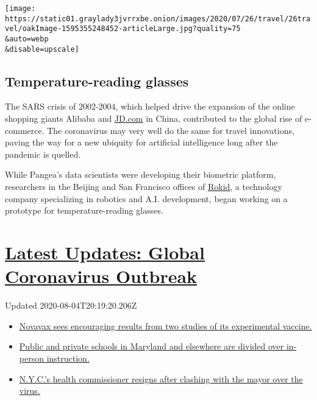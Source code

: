 \texttt{[image: https://static01.graylady3jvrrxbe.onion/images/2020/07/26/travel/26travel/oakImage-1595355248452-articleLarge.jpg?quality=75\\\&auto=webp\\\&disable=upscale]}

\hypertarget{temperature-reading-glasses}{%
\subsection{Temperature-reading
glasses}\label{temperature-reading-glasses}}

The SARS crisis of 2002-2004, which helped drive the expansion of the
online shopping giants Alibaba and \href{http://JD.com}{JD.com} in
China, contributed to the global rise of e-commerce. The coronavirus may
very well do the same for travel innovations, paving the way for a new
ubiquity for artificial intelligence long after the pandemic is quelled.

While Pangea's data scientists were developing their biometric platform,
researchers in the Beijing and San Francisco offices of
\href{https://www.rokid.com/}{Rokid}, a technology company specializing
in robotics and A.I. development, began working on a prototype for
temperature-reading glasses.

\hypertarget{latest-updates-global-coronavirus-outbreak}{%
\section{\texorpdfstring{\href{https://www.nytimes3xbfgragh.onion/2020/08/04/world/coronavirus-cases.html?action=click\&pgtype=Article\&state=default\&region=MAIN_CONTENT_1\&context=storylines_live_updates}{Latest
Updates: Global Coronavirus
Outbreak}}{Latest Updates: Global Coronavirus Outbreak}}\label{latest-updates-global-coronavirus-outbreak}}

Updated 2020-08-04T20:19:20.206Z

\begin{itemize}
\tightlist
\item
  \href{https://www.nytimes3xbfgragh.onion/2020/08/04/world/coronavirus-cases.html?action=click\&pgtype=Article\&state=default\&region=MAIN_CONTENT_1\&context=storylines_live_updates\#link-1228a480}{Novavax
  sees encouraging results from two studies of its experimental
  vaccine.}
\item
  \href{https://www.nytimes3xbfgragh.onion/2020/08/04/world/coronavirus-cases.html?action=click\&pgtype=Article\&state=default\&region=MAIN_CONTENT_1\&context=storylines_live_updates\#link-4825b93}{Public
  and private schools in Maryland and elsewhere are divided over
  in-person instruction.}
\item
  \href{https://www.nytimes3xbfgragh.onion/2020/08/04/world/coronavirus-cases.html?action=click\&pgtype=Article\&state=default\&region=MAIN_CONTENT_1\&context=storylines_live_updates\#link-4d1eafa8}{N.Y.C.'s
  health commissioner resigns after clashing with the mayor over the
  virus.}
\end{itemize}

